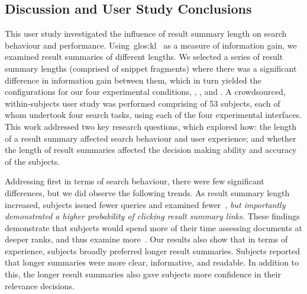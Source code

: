 \subsection{Discussion and User Study Conclusions}\label{chap:snippets:user:discussion}
This user study investigated the influence of result summary length on search behaviour and performance. Using~\gls{glos:kl}~\citep{kullback1951information} as a measure of information gain, we examined result summaries of different lengths. We selected a series of result summary lengths (comprised of snippet fragments) where there was a significant difference in information gain between them, which in turn yielded the configurations for our four experimental conditions, , ,  and . A crowdsourced, within-subjects user study was performed comprising of 53 subjects, each of whom undertook four search tasks, using each of the four experimental interfaces. This work addressed two key research questions, which explored how:  the length of a result summary affected search behaviour and user experience; and  whether the length of result summaries affected the decision making ability and accuracy of the subjects.

Addressing  first in terms of search behaviour, there were few significant differences, but we did observe the following trends. As result summary length increased, subjects issued fewer queries and examined fewer~, \emph{but importantly demonstrated a higher probability of clicking result summary links.} These findings demonstrate that subjects would spend more of their time assessing documents at deeper ranks, and thus examine more~. Our results also show that in terms of experience, subjects broadly preferred longer result summaries. Subjects reported that longer summaries were more clear, informative, and readable. In addition to this, the longer result summaries also gave subjects more confidence in their relevance decisions.

